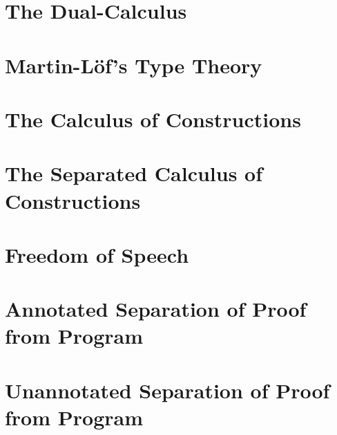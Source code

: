 \documentclass[phd,appendix,dedicationpage,ackpage,epigraphpage]{uithesis}
\begin{document}
\newpage
\section{The Dual-Calculus}
\label{sec:dc_all}
\DCall{}

\newpage
\section{Martin-L\"of's Type Theory}
\label{sec:tt_all}
\TTall{}

\newpage
\section{The Calculus of Constructions}
\label{sec:coc_all}
\CoCall{}

\newpage
\section{The Separated Calculus of Constructions}
\label{sec:coc_sep_all}
\CoCSall{}

\newpage
\section{Freedom of Speech}
\label{sec:freedom_of_speech_all}
\FSall{}

\newpage
\section{Annotated Separation of Proof from Program}
\label{sec:annotated_separation_of_proof_from_program}
\Sepall{}

\newpage
\section{Unannotated Separation of Proof from Program}
\label{sec:unannotated_separation_of_proof_from_program}
\SepUall{}
\end{document}
